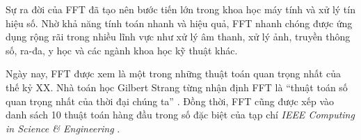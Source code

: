 Sự ra đời của FFT đã tạo nên bước tiến lớn trong khoa học máy tính và xử lý
tín hiệu số. Nhờ khả năng tính toán nhanh và hiệu quả, FFT nhanh chóng được
ứng dụng rộng rãi trong nhiều lĩnh vực như xử lý âm thanh, xử lý ảnh, truyền
thông số, ra-đa, y học và các ngành khoa học kỹ thuật khác.

Ngày nay, FFT được xem là một trong những thuật toán quan trọng nhất của thế
kỷ XX. Nhà toán học Gilbert Strang từng nhận định FFT là “thuật toán số quan
trọng nhất của thời đại chúng ta” \cite{strang1993wavelet}. Đồng thời, FFT
cũng được xếp vào danh sách 10 thuật toán hàng đầu trong số đặc biệt của tạp
chí \textit{IEEE Computing in Science \& Engineering}
\cite{10.1109/MCISE.2000.814652}.
